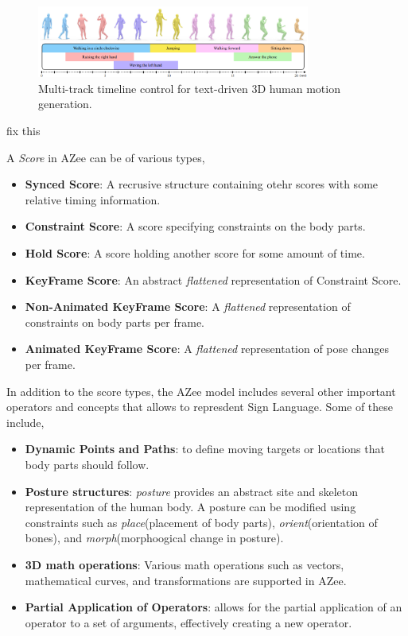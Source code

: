 \documentclass[../../main.tex]{subfiles}
\begin{document}
\begin{figure}
    \centering
    \includegraphics[width=0.8\textwidth]{chapters/multi_track/images/multi_track_other.png}
    \caption{Multi-track timeline control for text-driven 3D human motion generation.}
    \label{fig:multi_track_other}
\end{figure}

 fix this

A \emph{Score} in AZee can be of various types,

\begin{itemize}
  \item \textbf{Synced Score}: A recrusive structure containing otehr scores with some relative timing information.
  \item \textbf{Constraint Score}: A score specifying constraints on the body parts.
  \item \textbf{Hold Score}: A score holding another score for some amount of time.
  \item \textbf{KeyFrame Score}: An abstract \emph{flattened} representation of Constraint Score.
  \item \textbf{Non-Animated KeyFrame Score}: A \emph{flattened} representation of constraints on body parts per frame.
  \item \textbf{Animated KeyFrame Score}: A \emph{flattened} representation of pose changes per frame.
\end{itemize}

In addition to the score types, the AZee model includes several other important operators and concepts that allows to represdent Sign Language. Some of these include,

\begin{itemize}
  \item \textbf{Dynamic Points and Paths}: to define moving targets or locations that body parts should follow.
  \item \textbf{Posture structures}: \emph{posture} provides an abstract site and skeleton representation of the human body. A posture can be modified using constraints such as \emph{place}(placement of body parts), \emph{orient}(orientation of bones), and \emph{morph}(morphoogical change in posture).
  \item \textbf{3D math operations}: Various math operations such as vectors, mathematical curves, and transformations are supported in AZee.
  \item \textbf{Partial Application of Operators}: allows for the partial application of an operator to a set of arguments, effectively creating a new operator.
\end{itemize}
\end{document}
